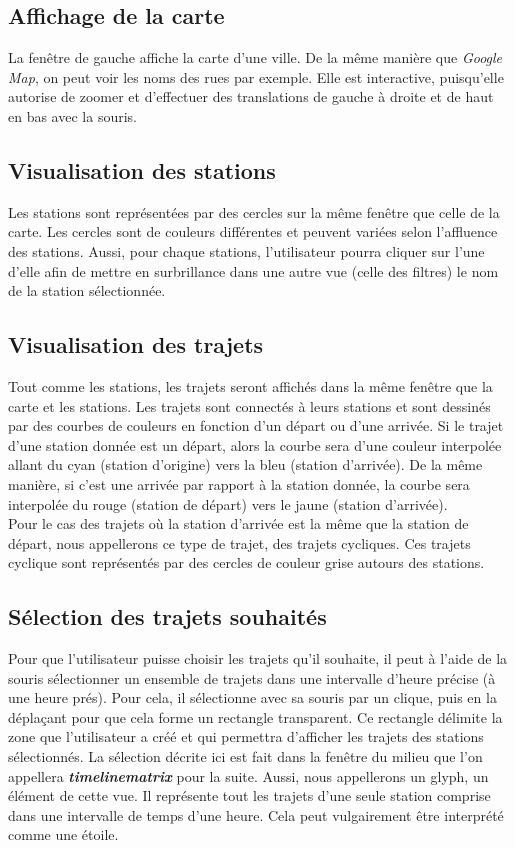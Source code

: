 \documentclass[12pt]{article}
\begin{document}
		\subsection{Affichage de la carte} \label{interactions_et_affichages}
		La fenêtre de gauche affiche la carte d'une ville. De la même manière que
		\textit{Google Map}, on peut voir les noms des rues par exemple. Elle est interactive,
		puisqu'elle autorise de zoomer et d'effectuer des translations de gauche à droite et 
		de haut en bas avec la souris.
		
		\subsection{Visualisation des stations}
		Les stations sont représentées par des cercles sur la même fenêtre que celle de la carte.
		Les cercles sont de couleurs différentes et peuvent variées selon l'affluence des stations.
		Aussi, pour chaque stations, l'utilisateur pourra cliquer sur l'une d'elle afin de mettre
		en surbrillance dans une autre vue (celle des filtres) le nom de la station sélectionnée.
		
		\subsection{Visualisation des trajets}
		Tout comme les stations, les trajets seront affichés dans la même fenêtre que la carte et
		les stations. Les trajets sont connectés à leurs stations et sont dessinés par des courbes
		de couleurs en fonction d'un départ ou d'une arrivée. Si le trajet d'une station donnée est
		un départ, alors la courbe sera d'une couleur interpolée allant du cyan (station d'origine)
		vers la bleu (station d'arrivée). De la même manière, si c'est une arrivée par rapport à la
		station donnée, la courbe sera interpolée du rouge (station de départ) vers le jaune
		(station d'arrivée).\\
		Pour le cas des trajets où la station d'arrivée est la même que la station de départ, nous
		appellerons ce type de trajet, des trajets cycliques. Ces trajets cyclique sont représentés
		par des cercles de couleur grise autours des stations.
	
		\subsection{Sélection des trajets souhaités}
		Pour que l'utilisateur puisse choisir les trajets qu'il souhaite, il peut à l'aide de la
		souris sélectionner un ensemble de trajets dans une intervalle d'heure précise (à une
		heure prés). Pour cela, il sélectionne avec sa souris par un clique, puis en la 
		déplaçant pour que cela forme un rectangle transparent. Ce rectangle délimite la zone
		que l'utilisateur a créé et qui permettra d'afficher les trajets des stations
		sélectionnés. La sélection décrite ici est fait dans la fenêtre du milieu que l'on
		appellera \textbf{\textit{timelinematrix}} pour la suite. Aussi, nous appellerons
		un glyph, un élément de cette vue. Il représente tout les trajets d'une seule station
		comprise dans une intervalle de temps d'une heure. Cela peut vulgairement être interprété
		comme une étoile.
		
\end{document}
